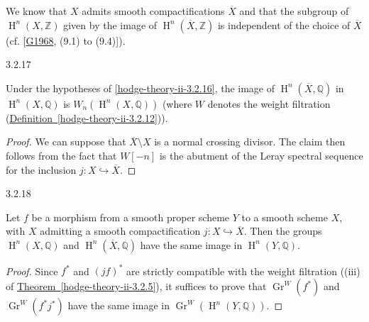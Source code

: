     We know that \(X\) admits smooth compactifications \(\overline {X}\) and that the subgroup of \(\operatorname {H}^n(X,\mathbb {Z})\) given by the image of \(\operatorname {H}^n(\overline {X},\mathbb {Z})\) is independent of the choice of \(\overline {X}\) (cf. [\hyperref[G1968]{G1968}, (9.1) to (9.4)]).\begin{corollary}{3.2.17}\label{hodge-theory-ii-3.2.17}\skipsinglepar\par{}Under the hypotheses of \cref{hodge-theory-ii-3.2.16}, the image of \(\operatorname {H}^n(\overline {X},\mathbb {Q})\) in \(\operatorname {H}^n(X,\mathbb {Q})\) is \(W_n(\operatorname {H}^n(X,\mathbb {Q}))\) (where \(W\) denotes the weight filtration (\hyperref[hodge-theory-ii-3.2.12]{Definition~\ref*{hodge-theory-ii-3.2.12}})).\begin{proof}\par{}We can suppose that \(\overline {X}\setminus  X\) is a normal crossing divisor.
      The claim then follows from the fact that \(W[-n]\) is the abutment of the Leray spectral sequence for the inclusion \(j\colon  X\hookrightarrow \overline {X}\).\end{proof}\end{corollary}\begin{corollary}{3.2.18}\label{hodge-theory-ii-3.2.18}\skipsinglepar\par{}Let \(f\) be a morphism from a smooth proper scheme \(Y\) to a smooth scheme \(X\), with \(X\) admitting a smooth compactification \(j\colon  X\hookrightarrow \overline {X}\).
    Then the groups \(\operatorname {H}^n(X,\mathbb {Q})\) and \(\operatorname {H}^n(\overline {X},\mathbb {Q})\) have the same image in \(\operatorname {H}^n(Y,\mathbb {Q})\).\begin{proof}\par{}Since \(f^*\) and \((jf)^*\) are strictly compatible with the weight filtration ((iii) of \hyperref[hodge-theory-ii-3.2.5]{Theorem~\ref*{hodge-theory-ii-3.2.5}}), it suffices to prove that \(\operatorname {Gr}^W(f^*)\) and \(\operatorname {Gr}^W(f^*j^*)\) have the same image in \(\operatorname {Gr}^W(\operatorname {H}^n(Y,\mathbb {Q}))\).

\end{proof}
\end{corollary}
